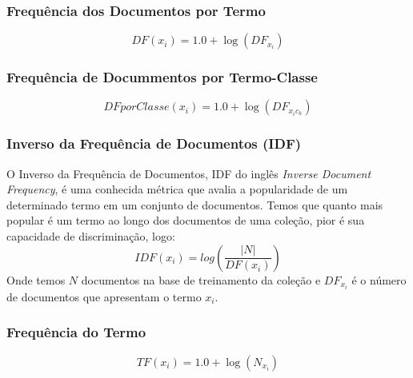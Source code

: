 \subsubsection{Frequência dos Documentos por Termo}
\label{subsubsection::df}

\begin{equation}\label{eqn::df}
   DF(x_i) = 1.0 + \log{ ( DF_{x_i} ) }
\end{equation}



\subsubsection{Frequência de Docummentos por Termo-Classe}
\label{subsubsection::sumdf}

\begin{equation}\label{eqn::sumtf}
   DFporClasse(x_i) = 1.0 + \log{ ( DF_{x_ic_k} ) }
\end{equation}


\subsubsection{Inverso da Frequência de Documentos (IDF)}
\label{subsubsection::idf}

O Inverso da Frequência de Documentos, IDF do inglês \textit{Inverse Document Frequency}, é uma conhecida métrica que avalia a popularidade de um determinado termo em um conjunto de documentos. Temos que quanto mais popular é um termo ao longo dos documentos de uma coleção, pior é sua capacidade de discriminação, logo:
\begin{equation}\label{eqn::tficf}
   IDF(x_i) = log( \frac{|N|} {DF(x_i)} )
\end{equation}
Onde temos $N$ documentos na base de treinamento da coleção e $DF_{x_i}$ é o número de documentos que apresentam o termo $x_i$.



\subsubsection{Frequência do Termo}
\label{subsubsection::sumtf}
\begin{equation}\label{eqn::sumtf}
   TF(x_i) = 1.0 + \log{ ( N_{x_i} ) }
\end{equation}


